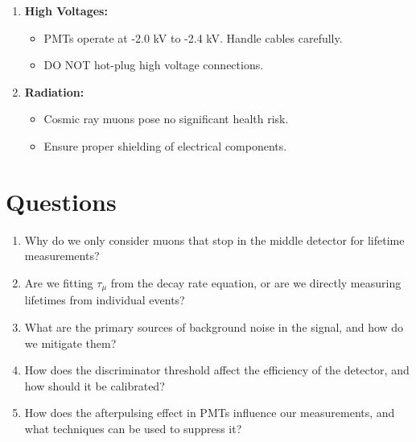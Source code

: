 \documentclass[aps,prb,onecolumn,11pt,superscriptaddress,floatfix,longbibliography]{revtex4-2}
\begin{document}
\begin{enumerate}
    \item \textbf{High Voltages:}  
    \begin{itemize}
        \item PMTs operate at -2.0 kV to -2.4 kV. Handle cables carefully.
        \item DO NOT hot-plug high voltage connections.
    \end{itemize}
    \item \textbf{Radiation:}  
    \begin{itemize}
        \item Cosmic ray muons pose no significant health risk.
        \item Ensure proper shielding of electrical components.
    \end{itemize}
\end{enumerate}

\section{\label{sec:questions}Questions}

\begin{enumerate}
    \item Why do we only consider muons that stop in the middle detector for lifetime measurements?
    \item Are we fitting \(\tau_\mu\) from the decay rate equation, or are we directly measuring lifetimes from individual events?
    \item What are the primary sources of background noise in the signal, and how do we mitigate them?
    \item How does the discriminator threshold affect the efficiency of the detector, and how should it be calibrated?
    \item How does the afterpulsing effect in PMTs influence our measurements, and what techniques can be used to suppress it?
\end{enumerate}

\nocite{BernheimAJP1956}  
\nocite{Buhr1983}  
\nocite{McMahon1983}  
\nocite{MartinAJP1984}  
\nocite{Liu1987}  
\nocite{Hanne1988}  


\end{document}
